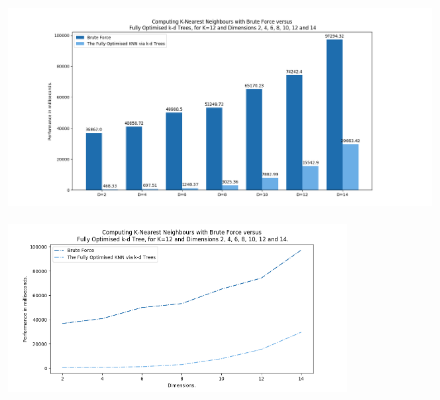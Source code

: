 \begin{figure}[H]
\centering
\includegraphics[width=1\textwidth]{pics/plot-figs/brute-mult-k12-side.png}
\caption{}
\end{figure}


\begin{figure}[H]
\centering
\includegraphics[width=0.8\textwidth]{pics/plot-figs/brute-vs-kdtree.png}
\caption{}
\end{figure}









